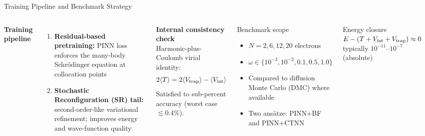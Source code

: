 \documentclass[aspectratio=169,10pt]{beamer}
\begin{document}
\begin{frame}{Training Pipeline and Benchmark Strategy}
  \begin{columns}[T]
      \textbf{Training pipeline}
      \begin{enumerate}
        \item \textbf{Residual-based pretraining:}
              PINN loss enforces the many-body Schr\"odinger equation
              at collocation points
        \item \textbf{Stochastic Reconfiguration (SR) tail:}
              second-order-like variational refinement; improves energy
              and wave-function quality
      \end{enumerate}
      \vspace{0.3cm}
      \textbf{Internal consistency check}\\
      Harmonic-plus-Coulomb virial identity:
      \[
        2\langle T\rangle = 2\langle V_{\rm trap}\rangle
        - \langle V_{\rm int}\rangle
      \]
      Satisfied to sub-percent accuracy (worst case $\lesssim 0.4\%$).
      \begin{block}{Benchmark scope}
        \begin{itemize}
          \item $N=2,6,12,20$ electrons
          \item $\omega\in\{10^{-3},10^{-2},0.1,0.5,1.0\}$
          \item Compared to diffusion Monte Carlo (DMC) where available
          \item Two ans\"atze: PINN+BF and PINN+CTNN
        \end{itemize}
      \end{block}
      \vspace{0.3cm}
      \begin{alertblock}{Energy closure}
        $E-(T+V_{\rm int}+V_{\rm trap})\approx 0$\\
        typically $10^{-11}$--$10^{-7}$ (absolute)
      \end{alertblock}
  \end{columns}
\end{frame}
\end{document}
